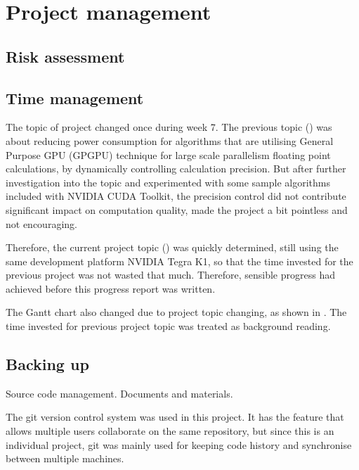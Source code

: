 \chapter{Project management}

\section{Risk assessment}

\section{Time management}

The topic of project changed once during week 7. The previous topic () was about reducing power consumption for algorithms that are utilising General Purpose GPU (GPGPU) technique for large scale parallelism floating point calculations, by dynamically controlling calculation precision. But after further investigation into the topic and experimented with some sample algorithms included with NVIDIA CUDA Toolkit, the precision control did not contribute significant impact on computation quality, made the project a bit pointless and not encouraging.

Therefore, the current project topic () was quickly determined, still using the same development platform NVIDIA Tegra K1, so that the time invested for the previous project was not wasted that much. Therefore, sensible progress had achieved before this progress report was written.

The Gantt chart also changed due to project topic changing, as shown in . The time invested for previous project topic was treated as background reading.

\section{Backing up}

Source code management.
Documents and materials.

The git version control system \cite{git} was used in this project. It has the feature that allows multiple users collaborate on the same repository, but since this is an individual project, git was mainly used for keeping code history and synchronise between multiple machines.


